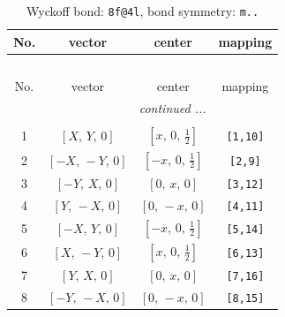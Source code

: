 \documentclass[fleqn,8pt]{jsarticle}
\begin{document}
\begin{longtable}{cccc}
\caption{Wyckoff bond: {\tt 8f@4l}, bond symmetry: {\tt m..}}
 \\
 \hline \hline
No. & vector & center & mapping \\ \hline \endfirsthead

\multicolumn{3}{l}{\tablename\ \thetable{}} \\
 \hline \hline
No. & vector & center & mapping \\ \hline \endhead

 \hline \hline
\multicolumn{3}{r}{\footnotesize\it continued ...} \\ \endfoot

 \hline \hline
\multicolumn{3}{r}{} \\ \endlastfoot

1 & $\left[ X,\, Y,\, 0 \right]$ & $\left[ x,\, 0,\, \frac{1}{2} \right]$ & {\tt [1,10]} \\ \hline
2 & $\left[ - X,\, - Y,\, 0 \right]$ & $\left[ - x,\, 0,\, \frac{1}{2} \right]$ & {\tt [2,9]} \\ \hline
3 & $\left[ - Y,\, X,\, 0 \right]$ & $\left[ 0,\, x,\, 0 \right]$ & {\tt [3,12]} \\ \hline
4 & $\left[ Y,\, - X,\, 0 \right]$ & $\left[ 0,\, - x,\, 0 \right]$ & {\tt [4,11]} \\ \hline
5 & $\left[ - X,\, Y,\, 0 \right]$ & $\left[ - x,\, 0,\, \frac{1}{2} \right]$ & {\tt [5,14]} \\ \hline
6 & $\left[ X,\, - Y,\, 0 \right]$ & $\left[ x,\, 0,\, \frac{1}{2} \right]$ & {\tt [6,13]} \\ \hline
7 & $\left[ Y,\, X,\, 0 \right]$ & $\left[ 0,\, x,\, 0 \right]$ & {\tt [7,16]} \\ \hline
8 & $\left[ - Y,\, - X,\, 0 \right]$ & $\left[ 0,\, - x,\, 0 \right]$ & {\tt [8,15]} \\
\end{longtable}
\renewcommand{\arraystretch}{1.2}
\end{document}
